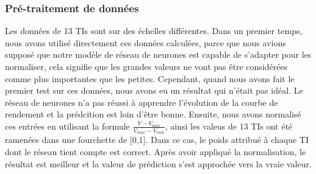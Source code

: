 \subsubsection{Pré-traitement de données}

Les données de 13 TIs sont sur des échelles différentes. Dans un premier temps, nous avons utilisé directement ces données calculées, parce que nous avions supposé que notre modèle de réseau de neurones est capable de s'adapter pour les normaliser, cela signifie que les grandes valeurs ne vont pas être considérées comme plus importantes que les petites. Cependant, quand nous avons fait le premier test sur ces données, nous avons eu un résultat qui n’était pas idéal. Le réseau de neurones n'a pas réussi à apprendre l'évolution de la courbe de rendement et la prédcition est loin d'être bonne. Ensuite, nous avons normalisé ces entrées en utilisant la formule $\frac{V-V_{min}}{V_{max}-V_{min}}$, ainsi les valeus de 13 TIs ont été ramenées dans une fourchette de [0,1]. Dans ce cas, le poids attribué à chaque TI dont le réseau tient compte est correct. Après avoir appliqué la normalisation, le résultat est meilleur et la valeur de prédiction s'est approchée vers la vraie valeur.


